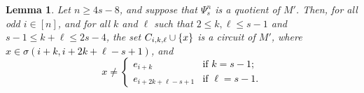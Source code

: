 \documentclass[11pt]{amsart}
\newtheorem{lemma}[theorem]{Lemma}
\newcommand{\bloo}{\textcolor{black}}
\begin{document}

\begin{lemma}
\label{quotient_circuits}
Let $n \geq 4s-8$, and suppose that $\Psi^n_s$ is a quotient of $M'$. Then, for all odd $i \in [n]$, and for all $k$ and $\ell$ such that $2 \leq k,\ell \leq s-1$ and $s-1 \leq k+\ell \leq 2s-4$, the set $C_{i, k, \ell} \cup \{\bloo{x}\}$ is a circuit of $M'$, where \bloo{$x \in \sigma(i+k,i+2k+\ell-s+1)$}, and
\bloo{$$x \neq
\begin{cases}
e_{i+k} & \mbox{if $k=s-1$}; \\
e_{i+2k+\ell-s+1} & \mbox{if $\ell=s-1$}.
\end{cases}$$}
\end{lemma}
\end{document}
